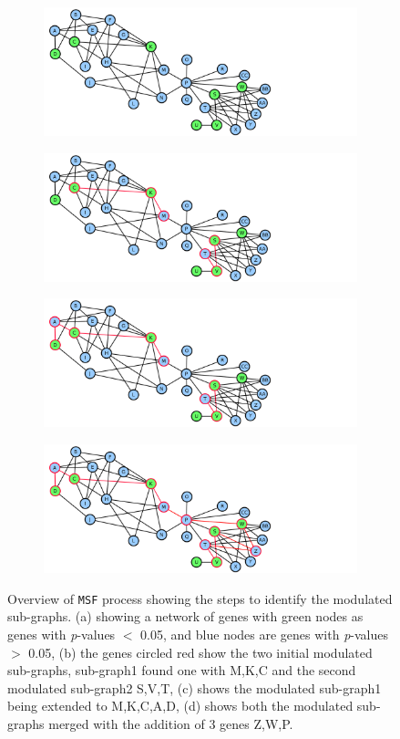 \documentclass[twocolumn]{article}
\begin{document}
\begin{figure}[ht!]
	
	\begin{subfigure}{.5\textwidth}
		\centering
		\includegraphics[width=10.0cm]{Tgfb1.png} 
		\caption{}
	\end{subfigure}
	\begin{subfigure}{.5\textwidth}
		\centering
		\includegraphics[width=10.0cm]{TGFBstep1.png}
		\caption{}
	\end{subfigure}
	\begin{subfigure}{.5\textwidth}
		\centering
		\includegraphics[width=10.0cm]{TGFBstep2.png} 
		\caption{}
	\end{subfigure}
	\begin{subfigure}{.5\textwidth}
		\centering
		\includegraphics[width=10.0cm]{TGFBstep3.png}
		\caption{}
	\end{subfigure}
	\caption{Overview of \texttt{MSF} process showing the steps to identify the modulated sub-graphs. (a) showing a network of genes with green nodes as genes with \textit{p}-values $< $ 0.05, and blue nodes are genes with \textit{p}-values $>$ 0.05, (b) the genes circled red show the two initial modulated sub-graphs, sub-graph1 found one with M,K,C and the second modulated sub-graph2 S,V,T, (c) shows the modulated sub-graph1 being extended to M,K,C,A,D, (d) shows both the modulated sub-graphs merged with the addition of 3 genes Z,W,P.}
\end{figure}
\end{document}

